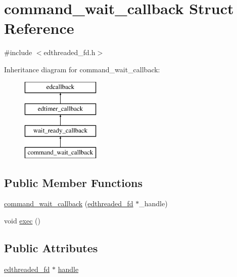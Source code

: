 \hypertarget{structcommand__wait__callback}{\section{command\-\_\-wait\-\_\-callback Struct Reference}
\label{structcommand__wait__callback}
}


{\ttfamily \#include $<$edthreaded\-\_\-fd.\-h$>$}

Inheritance diagram for command\-\_\-wait\-\_\-callback\-:\begin{figure}[H]
\begin{center}
\leavevmode
\includegraphics[height=4.000000cm]{structcommand__wait__callback}
\end{center}
\end{figure}
\subsection*{Public Member Functions}
\begin{DoxyCompactItemize}
\item 
\hyperlink{structcommand__wait__callback_ad7cfd5e02bb8af294a245b120bb542c7}{command\-\_\-wait\-\_\-callback} (\hyperlink{classedthreaded__fd}{edthreaded\-\_\-fd} $\ast$\-\_\-handle)
\item 
void \hyperlink{structcommand__wait__callback_ae5ab034230cd73f6203cee386ba1993c}{exec} ()
\end{DoxyCompactItemize}
\subsection*{Public Attributes}
\begin{DoxyCompactItemize}
\item 
\hyperlink{classedthreaded__fd}{edthreaded\-\_\-fd} $\ast$ \hyperlink{structcommand__wait__callback_a0abd24ce601b0e1452cde7eddb7b85b9}{handle}
\end{DoxyCompactItemize}


